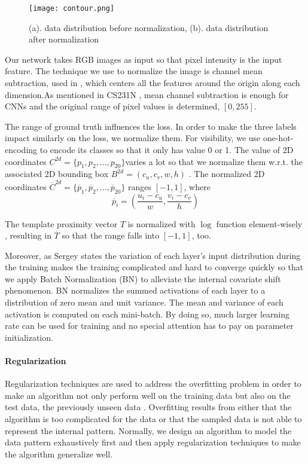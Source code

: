\begin{figure}[h]		
	\texttt{[image: contour.png]}
	\caption{(a). data distribution before normalization, (b). data distribution after normalization}
	\centering
	\label{figure:contour}
\end{figure}

Our network takes RGB images as input so that pixel intensity is the input feature. The technique we use to normalize the image is channel mean subtraction, used in \cite{DBLP:journals/corr/SimonyanZ14a, DBLP:journals/corr/GirshickDDM13}, which centers all the features around the origin along each dimension.As mentioned in CS231N \cite{CS231N}, mean channel subtraction is enough for CNNs and the original range of pixel values is determined, \ie $[0, 255]$.

The range of ground truth influences the loss. In order to make the three labels impact similarly on the loss, we normalize them. For visibility, we use one-hot-encoding \cite{One-hot} to encode its classes so that it only has value 0 or 1. The value of 2D coordinates $C^{2d}  = \{p_1, p_2, ...,p_{20}\}$varies a lot so that we normalize them w.r.t. the associated 2D bounding box $B^{2d} = (c_u, c_v, w, h)$ \cite{DBLP:journals/corr/ChabotCRTC17}. The normalized 2D coordinates $\overline{C}^{2d}  = \{\overline{p}_1, \overline{p}_2, ...,\overline{p}_{20}\}$ ranges $[-1, 1]$, where
\begin{equation}
\overline{p}_i  = (\frac{u_i - c_u}{w}, \frac{v_i - c_v}{h})
\end{equation}

The template proximity vector $T$  is normalized with $\log$ function element-wisely \cite{DBLP:journals/corr/ChabotCRTC17}, resulting in $\overline T$ so that the range falls into $[-1, 1]$, too.

Moreover, as Sergey \etal \cite{DBLP:journals/corr/IoffeS15}states the variation of each layer's input distribution during the training makes the training complicated and hard to converge quickly so that we apply Batch Normalization (BN) to alleviate the internal covariate shift phenomenon.  BN normalizes the summed activations of each layer to a distribution of zero mean and unit variance. The mean and variance of each activation is computed on each mini-batch. By doing so, much larger learning rate can be used for training and no special attention has to pay on parameter initialization. 
 
\paragraph{Regularization}
Regularization techniques are used to address the overfitting problem in order to make an algorithm not only perform well on the training data but also on the test data, the previously unseen data \cite{Goodfellow-et-al-2016}. Overfitting results from either that the algorithm is too complicated for the data or that the sampled data is not able to represent the internal pattern. Normally, we design an algorithm to model  the data pattern exhaustively first and then apply regularization techniques to make the algorithm generalize well.  


